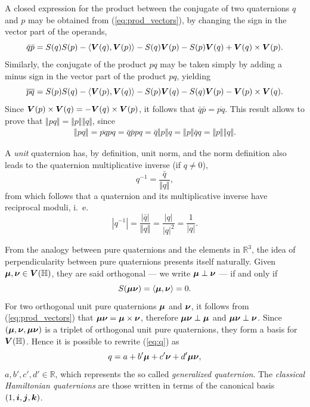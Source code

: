 A closed expression for the product between the conjugate of two quaternions $q$ and $p$ may be obtained from (\ref{eq:prod_vectors}), by changing the sign in the vector part of the operands,
\begin{equation}
\bar{q} \bar{p} = S(q)S(p) - \langle\boldsymbol{V}(q), \boldsymbol{V}(p)\rangle
- S(q) \boldsymbol{V}(p) - S(p)\boldsymbol{V}(q) + \boldsymbol{V}(q) \times \boldsymbol{V}(p).
\end{equation}
Similarly, the conjugate of the product $pq$ may be taken simply by adding a minus sign in the vector part of the product $pq$, yielding
\begin{equation}
\overline{p q} = S(p)S(q) - \langle\boldsymbol{V}(p), \boldsymbol{V}(q)\rangle
- S(p) \boldsymbol{V}(q) - S(q)\boldsymbol{V}(p) - \boldsymbol{V}(p) \times \boldsymbol{V}(q).
\end{equation}
Since $\boldsymbol{V}(p) \times \boldsymbol{V}(q) = - \boldsymbol{V}(q) \times \boldsymbol{V}(p)$, it follows that $\bar{q} \bar{p} = \overline{p q}$. This result allows to prove that $\Vert p q \Vert = \Vert p \Vert \Vert q \Vert$, since
\begin{equation}
\label{eq:normproduct}
\begin{aligned}
    \Vert pq \Vert = \overline{pq} pq = \bar{q} \bar{p} p q = \bar{q} \Vert p \Vert q = \Vert p \Vert \bar{q} q =
    \Vert p \Vert \Vert q \Vert.
\end{aligned}
\end{equation}

A \textit{unit} quaternion has, by definition, unit norm, and the norm definition also leads to the quaternion multiplicative inverse (if $q \neq 0$),
\begin{equation}
    q^{-1} = \frac{\bar{q}}{\Vert q \Vert},
\end{equation}
from which follows that a quaternion and its multiplicative inverse have reciprocal moduli, i.~e.
\begin{equation}
    \label{eq:reciprocalmoduli}
    |q^{-1}| = \frac{|\bar{q}|}{\Vert q \Vert} =
    \frac{|q|}{|q|^2}=
    \frac{1}{|q|}.
\end{equation}

From the analogy between pure quaternions and the elements in $ \mathbb{R}^3 $, the idea of perpendicularity between pure quaternions presents itself naturally. Given $ \boldsymbol{\mu},  \boldsymbol{\nu} \in \boldsymbol{V}(\mathbb{H})$, they are said orthogonal --- we write $ \boldsymbol{\mu} \perp \boldsymbol{\nu} $ --- if and only if
\begin{equation}
    S(\boldsymbol{\mu} \boldsymbol{\nu}) = \langle \boldsymbol{\mu}, \boldsymbol{\nu} \rangle = 0.
\end{equation}
For two orthogonal unit pure quaternions $ \boldsymbol{\mu} $ and $ \boldsymbol{\nu} $, it follows from (\ref{eq:prod_vectors}) that $ \boldsymbol{\mu} \boldsymbol{\nu}  = \boldsymbol{\mu} \times \boldsymbol{\nu}$, therefore $ \boldsymbol{\mu} \boldsymbol{\nu} \perp \boldsymbol{\mu} $ and $ \boldsymbol{\mu} \boldsymbol{\nu} \perp \boldsymbol{\nu} $. Since $ (\boldsymbol{\mu}, \boldsymbol{\nu}, \boldsymbol{\mu} \boldsymbol{\nu}) $ is a triplet of orthogonal unit pure quaternions, they form a basis for $ \boldsymbol{V} (\mathbb{H}) $. Hence it is possible to rewrite (\ref{eq:q}) as
\begin{equation}
    \label{eq:quat_generalizado}
    q = a + b'\boldsymbol{\mu} + c'\boldsymbol{\nu} + d'\boldsymbol{\mu} \boldsymbol{\nu},
\end{equation}
$a, b', c', d' \in \mathbb{R}$,
which represents the so called \emph{generalized quaternion}. The \emph{classical Hamiltonian quaternions} are those written in terms of the canonical basis $ (1, \boldsymbol{i}, \boldsymbol{j}, \boldsymbol{k}) $.


